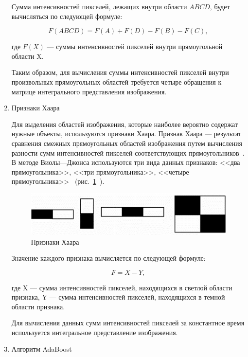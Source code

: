 \begin{enumerate}[label=\arabic*.]
    Сумма интенсивностей пикселей, лежащих внутри области $ABCD$, будет вычисляться по следующей формуле:

    \begin{equation}
        F(ABCD) = F(A) + F(D) - F(B) - F(C),
    \end{equation}

    где $F(X)$ --- суммы интенсивностей пикселей внутри прямоугольной области X.

    Таким образом, для вычисления суммы интенсивностей пикселей внутри произвольных прямоугольных областей требуется четыре обращения к матрице интегрального представления изображения.
    
    \item Признаки Хаара

    Для выделения областей изображения, которые наиболее вероятно содержат нужные объекты, используются признаки Хаара. Признак Хаара --- результат сравнения смежных прямоугольных областей изображения путем вычисления разности сумм интенсивностей пикселей соответствующих прямоугольников~\cite{novosibirsk}. 
    В методе Виолы---Джонса используются три вида данных признаков: <<два прямоугольника>>, <<три прямоугольника>>, <<четыре прямоугольника>>~\cite{viola} (рис.~\ref{img:haar}~\cite{astrahan}).

    \begin{figure}[h]
	\centering
	\includegraphics[height=0.1\textheight]{img/haar.jpg}
	\caption{Признаки Хаара}
    \label{img:haar}
    \end{figure}

    Значение каждого признака вычисляется по следующей формуле:

    \begin{equation}
        F = X - Y,
    \end{equation}

    где X --- сумма интенсивностей пикселей, находящихся в светлой области признака, Y --- сумма интенсивностей пикселей, находящихся в темной области признака.

    Для вычисления данных сумм интенсивностей пикселей за константное время используется интегральное представление изображения.
    
    \item Алгоритм AdaBoost


\end{enumerate}
